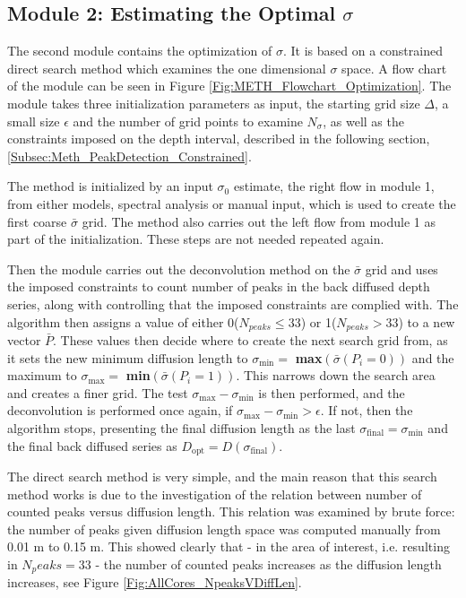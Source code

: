 \documentclass[../../CompleteThesis2/Complete_2ndDraft]{subfiles}
\begin{document}
\subsection[Module 2]{Module 2: Estimating the Optimal $\sigma$}
\label{Subsec:Method_SigmaMethod_Module2}
The second module contains the optimization of $\sigma$. It is based on a constrained direct search method which examines the one dimensional $\sigma$ space. A flow chart of the module can be seen in Figure \ref{Fig:METH_Flowchart_Optimization}. The module takes three initialization parameters as input, the starting grid size $\Delta$, a small size $\epsilon$ and the number of grid points to examine $N_{\sigma}$, as well as the constraints imposed on the depth interval, described in the following section, \ref{Subsec:Meth_PeakDetection_Constrained}.



The method is initialized by an input $\sigma_0$ estimate, the right flow in module 1, from either models, spectral analysis or manual input, which is used to create the first coarse $\bar{\sigma}$ grid. The method also carries out the left flow from module 1 as part of the initialization. These steps are not needed repeated again.

Then the module carries out the deconvolution method on the $\bar{\sigma}$ grid and uses the imposed constraints to count number of peaks in the back diffused depth series, along with controlling that the imposed constraints are complied with. The algorithm then assigns a value of either 0($N_{peaks} \leq 33$) or 1($N_{peaks}>33$) to a new vector $\bar{P}$. These values then decide where to create the next search grid from, as it sets the new minimum diffusion length to $\sigma_{\text{min}}=$ \textbf{max}$(\bar{\sigma}(P_i=0))$ and the maximum to $\sigma_{\text{max}}=$ \textbf{min}$(\bar{\sigma}(P_i=1))$. This narrows down the search area and creates a finer grid. The test $\sigma_{\text{max}} - \sigma_{\text{min}}$ is then performed, and the deconvolution is performed once again, if $\sigma_{\text{max}} - \sigma_{\text{min}} >\epsilon$. If not, then the algorithm stops, presenting the final diffusion length as the last $\sigma_{\text{final}} = \sigma_{\text{min}}$ and the final back diffused series as $D_{\text{opt}}=D(\sigma_{\text{final}})$.

The direct search method is very simple, and the main reason that this search method works is due to the investigation of the relation between number of counted peaks versus diffusion length. This relation was examined by brute force: the number of peaks given diffusion length space was computed manually from 0.01 m to 0.15 m. This showed clearly that - in the area of interest, i.e. resulting in $N_peaks=33$ - the number of counted peaks increases as the diffusion length increases, see Figure \ref{Fig:AllCores_NpeaksVDiffLen}. 
\end{document}
